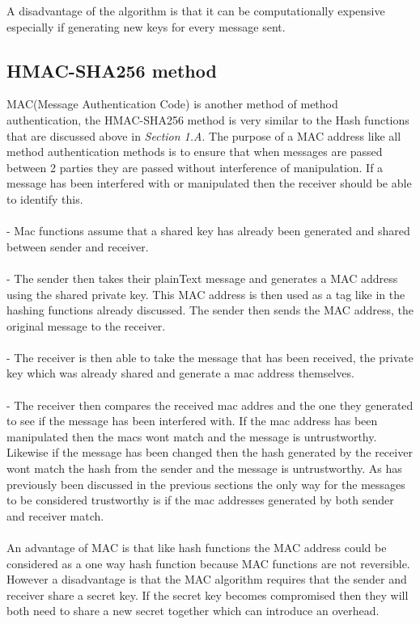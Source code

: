 \documentclass[a4paper, twoside, 11pt]{article}
\begin{document}
A disadvantage of the algorithm is that it can be computationally expensive especially if generating new keys for every message sent.


\subsection{HMAC-SHA256 method}
MAC(Message Authentication Code) is another method of method authentication, the HMAC-SHA256 method is very similar to the Hash functions that are discussed above in \textit{Section 1.A}. The purpose of a MAC address like all method authentication methods is to ensure that when messages are passed between 2 parties they are passed without interference of manipulation. If a message has been interfered with or manipulated then the receiver should be able to identify this.\\
\\
 - Mac functions assume that a shared key has already been generated and shared between sender and receiver. \\
\\
 - The sender then takes their plainText message and generates a MAC address using the shared private key. This MAC address is then used as a tag like in the hashing functions already discussed. The sender then sends the MAC address, the original message to the receiver.\\
\\
 - The receiver is then able to take the message that has been received, the private key which was already shared and generate a mac address themselves.\\
\\
 - The receiver then compares the received mac addres and the one they generated to see if the message has been interfered with. If the mac address has been manipulated then the macs wont match and the message is untrustworthy. Likewise if the message has been changed then the hash generated by the receiver wont match the hash from the sender and the message is untrustworthy. As has previously been discussed in the previous sections the only way for the messages to be considered trustworthy is if the mac addresses generated by both sender and receiver match. \\
\\

An advantage of MAC is that like hash functions the MAC address could be considered as a one way hash function because MAC functions are not reversible. However a disadvantage is that the MAC algorithm requires that the sender and receiver share a secret key. If the secret key becomes compromised then they will both need to share a new secret together which can introduce an overhead. 
\end{document}

